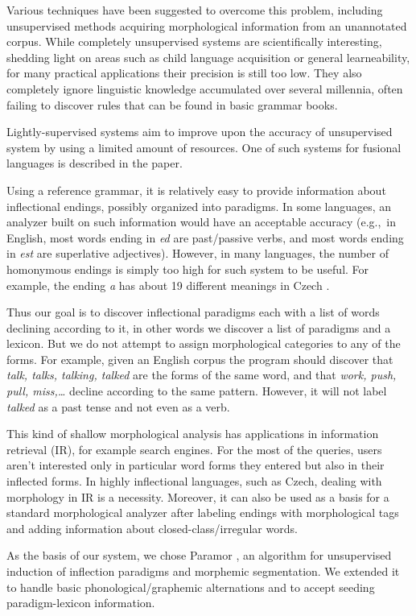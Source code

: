 \documentclass{itatnew}
\newcommand{\e}[1]{\textit{#1}} %
\newcommand{\eg}{e.g.,~}
\begin{document}
Various techniques have been suggested to overcome this problem, including unsupervised methods acquiring morphological information from an unannotated corpus. While completely unsupervised systems are scientifically interesting, shedding light on areas such as child language acquisition or general learneability, for many practical applications their precision is still too low.  They also completely ignore linguistic knowledge accumulated over several millennia, often failing to discover rules that can be found in basic grammar books.

Lightly-supervised systems aim to improve upon the accuracy of unsupervised system by using a limited amount of resources. One of such systems for fusional languages is described in the paper.

Using a reference grammar, it is relatively easy to provide information about inflectional endings, possibly organized into paradigms. In some languages, an analyzer built on such information would have an acceptable accuracy (\eg in English, most words ending in \e{ed} are past/passive verbs, and most words ending in \e{est} are superlative adjectives). However, in many languages, the number of homonymous endings is simply too high for such system to be useful. For example, the ending \e{a} has about 19 different meanings in Czech \cite{feldman-hana-2010-rodopi}.

Thus our goal is to discover inflectional paradigms each with a list of words declining according to it, in other words we discover a list of paradigms and a lexicon. But we do not attempt to assign morphological categories to any of the forms. For example, given an English corpus the program should discover that \e{talk, talks, talking, talked} are the forms of the same word, and that \e{work, push, pull, miss,\ldots} decline according to the same pattern. However, it will not label \e{talked} as a past tense and not even as a verb.

This kind of shallow morphological analysis has applications in information retrieval (IR), for example search engines. For the most of the queries, users aren't interested only in particular word forms they entered but also in their inflected forms. In highly inflectional languages, such as Czech, dealing with morphology in IR is a necessity. Moreover, it can also be used as a basis for a standard morphological analyzer after labeling endings with morphological tags and adding information about closed-class/irregular words.

As the basis of our system, we chose Paramor \cite{monson09}, an algorithm for unsupervised induction of inflection paradigms and morphemic segmentation. We extended it to handle basic phonological/graphemic alternations and to accept seeding paradigm-lexicon information.
\end{document}
